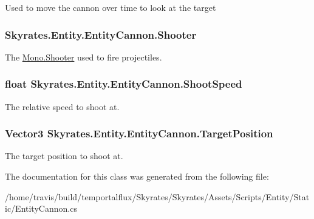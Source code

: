 Used to move the cannon over time to look at the target 

\hypertarget{class_skyrates_1_1_entity_1_1_entity_cannon_a1d1ce67467d722f4088c53cb14c56d8a}{
\subsubsection[{Shooter}]{ Skyrates.\-Entity.\-Entity\-Cannon.\-Shooter}}\label{class_skyrates_1_1_entity_1_1_entity_cannon_a1d1ce67467d722f4088c53cb14c56d8a}


The \hyperlink{class_skyrates_1_1_mono_1_1_shooter}{Mono.\-Shooter} used to fire projectiles. 

\hypertarget{class_skyrates_1_1_entity_1_1_entity_cannon_a9ee533d27944ebec7884f18fa97b9eb9}{
\subsubsection[{Shoot\-Speed}]{\setlength{\rightskip}{0pt plus 5cm}float Skyrates.\-Entity.\-Entity\-Cannon.\-Shoot\-Speed}}\label{class_skyrates_1_1_entity_1_1_entity_cannon_a9ee533d27944ebec7884f18fa97b9eb9}


The relative speed to shoot at. 

\hypertarget{class_skyrates_1_1_entity_1_1_entity_cannon_a827e5c62b130603513eae3f4c51a230f}{
\subsubsection[{Target\-Position}]{\setlength{\rightskip}{0pt plus 5cm}Vector3 Skyrates.\-Entity.\-Entity\-Cannon.\-Target\-Position}}\label{class_skyrates_1_1_entity_1_1_entity_cannon_a827e5c62b130603513eae3f4c51a230f}


The target position to shoot at. 



The documentation for this class was generated from the following file\-:\begin{DoxyCompactItemize}
\item 
/home/travis/build/temportalflux/\-Skyrates/\-Skyrates/\-Assets/\-Scripts/\-Entity/\-Static/Entity\-Cannon.\-cs\end{DoxyCompactItemize}
